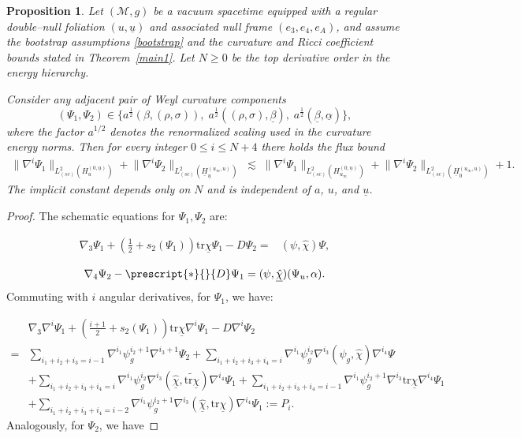 \documentclass{amsart}
\newtheorem{proposition}{Proposition}[section]
\newcommand{\chihat}{\hat{\chi}}
\newcommand{\chibar}{\underline{\chi}}
\newcommand{\chibarhat}{\underline{\hat{\chi}}}
\newcommand{\ubar}{\underline{u}}
\newcommand{\sumitm}{\sum_{i_1+i_2+i_3=i-1}}
\newcommand{\sumif}{\sum_{i_1+i_2+i_3+i_4=i}}
\newcommand{\sumifi}{\sum_{i_1+i_2+i_3+i_4=i-1}}
\newcommand{\sumifim}{\sum_{i_1+i_2+i_3+i_4=i-2}}
\newcommand{\tildetr}{\widetilde{\tr \chibar}}
\newcommand{\nablap}{\nabla^{i_1}\psi_g^{i_2}}
\newcommand{\nablapp}{\nabla^{i_1}\psi_g^{i_2+1}}
\newcommand{\scaletwoHzero}[1]{\lVert{#1} \rVert_{L^2_{(sc)}(H_{u_{\infty}}^{(0,\underline{u})})}}
\newcommand{\scaletwoHu}[1]{\lVert{#1} \rVert_{L^2_{(sc)}(H_u^{(0,\underline{u})})}}
\newcommand{\scaletwoHbarzero}[1]{\lVert{#1} \rVert_{L^2_{(sc)}(\underline{H}_{0}^{(u_{\infty},u)})}}
\newcommand{\scaletwoHbaru}[1]{\lVert{#1} \rVert_{L^2_{(sc)}(\underline{H}_{\underline{u}}^{(u_{\infty},u)})}}
\newcommand{\nablat}{\nabla^{i_3}}
\newcommand{\nablaf}{\nabla^{i_4}}
\newcommand{\Hodge}[1]{\prescript{*}{}{#1}}
\newcommand{\tr}{\mbox{tr}}
\begin{document}
{\begin{proposition}
\label{prop:coupled-flux}
Let $(\mathcal M,g)$ be a vacuum spacetime equipped with a regular double–null foliation
$(u,\ubar)$ and associated null frame $(e_3,e_4,e_A)$, and assume the bootstrap
assumptions \eqref{bootstrap} and the curvature and Ricci coefficient bounds stated in
Theorem~\ref{main1}. Let $N\ge 0$ be the top derivative order in the energy hierarchy.

\noindent Consider any adjacent pair of Weyl curvature components
\[
(\Psi_1,\Psi_2)\in
\Big\{
a^{\frac12}(\beta,(\rho,\sigma)),\;
a^{\frac12}((\rho,\sigma),\underline\beta),\;
a^{\frac12}(\underline\beta,\underline\alpha)
\Big\},
\]
where the factor $a^{1/2}$ denotes the renormalized scaling used in the curvature
energy norms. Then for every integer $0\le i\le N+4$ there holds the flux bound
\begin{align}
\label{eq:coupled-flux}
\scaletwoHu{\nabla^{i}\Psi_1}
+
\scaletwoHbaru{\nabla^{i}\Psi_2}
\;\lesssim\;
\scaletwoHzero{\nabla^{i}\Psi_1}
+
\scaletwoHbarzero{\nabla^{i}\Psi_2}
+ 1.
\end{align}
The implicit constant depends only on $N$ and is
independent of $a$, $u$, and $\ubar$.
\end{proposition}


\begin{proof}
The schematic equations for $\Psi_1, \Psi_2$ are:

\begin{align}
       \nonumber  \nabla_3 \Psi_1 + \left( \frac{1}{2} + s_2(\Psi_1)\right) \tr\chibar \Psi_1 - D \Psi_2 =& (\psi,\chihat)\Psi,
    \end{align}

\begin{equation}
    \begin{split}
        \nabla_4 \Psi_2- \Hodge{D}\Psi_1 = (\psi,\chibarhat)(\Psi_u, \alpha).
    \end{split}
\end{equation}Commuting with $i$ angular derivatives, for $\Psi_1$, we have:

\begin{equation}
    \begin{split}
        &\nabla_3 \nabla^i \Psi_1 + \left(\frac{i+1}{2}+s_2(\Psi_1)\right)\tr\chibar \nabla^i \Psi_1 - D\nabla^i \Psi_2 \\= &\sumitm \nablapp \nabla^{i_3+1}\Psi_2 +\sumif\nablap \nablat(\psi_g,\chihat)\nablaf\Psi  \\&+ \sumif\nablap \nablat(\chibarhat,\tildetr) \nablaf \Psi_1 + \sumifi \nablapp \nablat \tr\chibar \nablaf \Psi_1 \\ &+\sumifim \nablapp \nablat (\chibarhat,\tr\chibar) \nablaf \Psi_1  := P_i.
    \end{split}
\end{equation}Analogously, for $\Psi_2$, we have 


\end{proof}}
\end{document}

